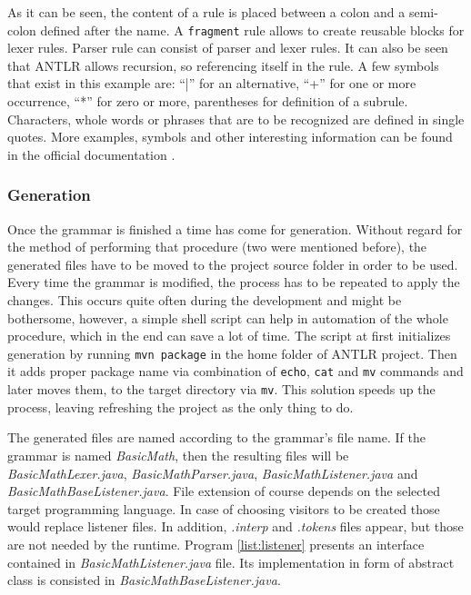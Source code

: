 As it can be seen, the content of a rule is placed between a colon and a semi-colon defined after the name. A \texttt{fragment} rule allows to create reusable blocks for lexer rules. Parser rule can consist of parser and lexer rules. It can also be seen that ANTLR allows recursion, so referencing itself in the rule. A few symbols that exist in this example are: ``|'' for an alternative, ``+'' for one or more occurrence, ``*'' for zero or more, parentheses for definition of a subrule. Characters, whole words or phrases that are to be recognized are defined in single quotes. More examples, symbols and other interesting information can be found in the official documentation \cite{ANTLRDOC2019}.

\subsubsection{Generation}

Once the grammar is finished a time has come for generation. Without regard for the method of performing that procedure (two were mentioned before), the generated files have to be moved to the project source folder in order to be used. Every time the grammar is modified, the process has to be repeated to apply the changes. This occurs quite often during the development and might be bothersome, however, a simple shell script can help in automation of the whole procedure, which in the end can save a lot of time. The script at first initializes generation by running \texttt{mvn package} in the home folder of ANTLR project. Then it adds proper package name via combination of \texttt{echo}, \texttt{cat} and \texttt{mv} commands and later moves them, to the target directory via \texttt{mv}. This solution speeds up the process, leaving refreshing the project as the only thing to do. 

The generated files are named according to the grammar's file name. If the grammar is named \textit{BasicMath}, then the resulting files will be \textit{BasicMathLexer.java}, \textit{BasicMathParser.java}, \textit{BasicMathListener.java} and \textit{BasicMathBaseListener.java}. File extension of course depends on the selected target programming language. In case of choosing visitors to be created those would replace listener files. In addition, \textit{.interp} and \textit{.tokens} files appear, but those are not needed by the runtime. Program \ref{list:listener} presents an interface contained in \textit{BasicMathListener.java} file. Its implementation in form of abstract class is consisted in \textit{BasicMathBaseListener.java}.

